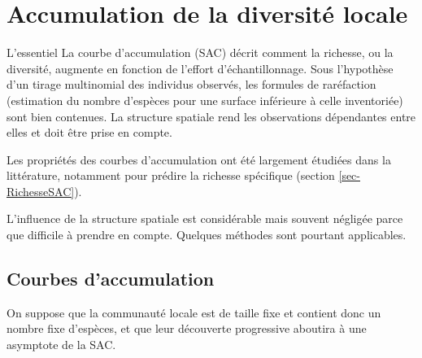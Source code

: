 \documentclass[
  11pt,
  french,
  a4paper,
  extrafontsizes,onecolumn,openright
  ]{memoir}
\newenvironment{Summary}
  {\begin{bclogo}[logo=\bctrombone, noborder=true, couleur=lightgray!50]{L'essentiel}\parindent0pt}
  {\end{bclogo}}
\newlength{\rf}
\begin{document}
\normalsize

\hypertarget{chap-Accumulation}{%
\chapter{Accumulation de la diversité locale}\label{chap-Accumulation}}

\scriptsize

\begin{Summary}
La courbe d'accumulation (SAC) décrit comment la richesse, ou la
diversité, augmente en fonction de l'effort d'échantillonnage. Sous
l'hypothèse d'un tirage multinomial des individus observés, les formules
de raréfaction (estimation du nombre d'espèces pour une surface
inférieure à celle inventoriée) sont bien contenues. La structure
spatiale rend les observations dépendantes entre elles et doit être
prise en compte.
\end{Summary}

\normalsize

Les propriétés des courbes d'accumulation ont été largement étudiées dans la littérature, notamment pour prédire la richesse spécifique (section \ref{sec-RichesseSAC}).

L'influence de la structure spatiale est considérable mais souvent négligée parce que difficile à prendre en compte.
Quelques méthodes sont pourtant applicables.

\hypertarget{sec-SAC}{%
\section{Courbes d'accumulation}\label{sec-SAC}}

On suppose que la communauté locale est de taille fixe et contient donc un nombre fixe d'espèces, et que leur découverte progressive aboutira à une asymptote de la SAC.



\scriptsize
\end{document}
